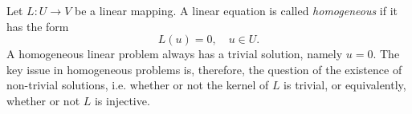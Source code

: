 \documentclass[12pt]{article}
\begin{document}
Let $L:U\rightarrow V$ be a linear mapping. A linear equation
is called {\em homogeneous} if it has
the form
$$L(u)=0,\quad u\in U.$$
A homogeneous linear problem always has a
trivial solution, namely $u=0$.  The key issue in homogeneous problems
is, therefore, the question of the existence of non-trivial solutions,
i.e. whether or not the kernel of $L$ is trivial, or equivalently,
whether or not $L$ is injective.
\end{document}
